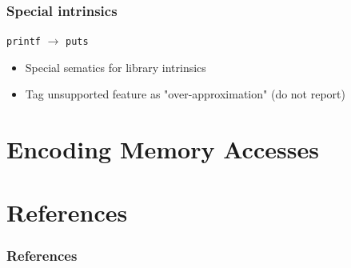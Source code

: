 \documentclass[aspectratio=169]{ctexbeamer}
\begin{document}
\begin{frame}
    \frametitle{Special intrinsics}
    \begin{center}
        \texttt{printf} $\rightarrow$ \texttt{puts}
    \end{center}

    \begin{itemize}
        \pause
        \item Special sematics for library intrinsics
              \pause
        \item Tag unsupported feature as "over-approximation" (do not report)
    \end{itemize}

\end{frame}


\section{Encoding Memory Accesses}

\section{References}


\begin{frame}[allowframebreaks]
    \frametitle{References}
    
    
\end{frame}
\end{document}
